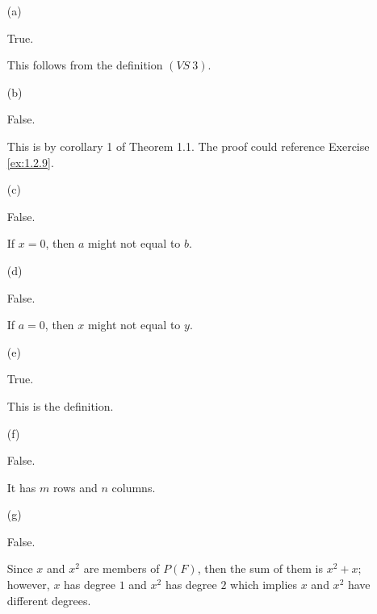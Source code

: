 \begin{Exercise}
\begin{enumerate}[(a)]
\item [(a)]
\begin{answer}
True.
\end{answer}
\begin{solution}
This follows from the definition $(VS\ 3)$.
\end{solution}

\item [(b)]
\begin{answer}
False.
\end{answer}
\begin{solution}
This is by corollary 1 of Theorem 1.1. The proof could reference Exercise \ref{ex:1.2.9}.
\end{solution}

\item [(c)]
\begin{answer}
False.
\end{answer}
\begin{solution}
If $x = 0$, then $a$ might not equal to $b$.
\end{solution}

\item [(d)]
\begin{answer}
False.
\end{answer}
\begin{solution}
If $a = 0$, then $x$ might not equal to $y$.
\end{solution}

\item [(e)]
\begin{answer}
True.
\end{answer}
\begin{solution}
This is the definition.
\end{solution}

\item [(f)]
\begin{answer}
False.
\end{answer}
\begin{solution}
It has $m$ rows and $n$ columns.
\end{solution}

\item [(g)]
\begin{answer}
False.
\end{answer}
\begin{solution}
Since $x$ and $x^2$ are members of $P(F)$, then the sum of them is $x^2+x$; however, $x$ has degree $1$ and $x^2$ has degree $2$ which implies $x$ and $x^2$ have different degrees.
\end{solution}


\end{enumerate}
\end{Exercise}

